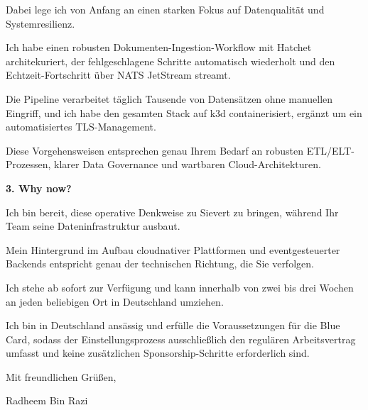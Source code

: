 \documentclass[11pt,a4paper]{coverletter}
\begin{document}
Dabei lege ich von Anfang an einen starken Fokus auf Datenqualität und Systemresilienz.

Ich habe einen robusten Dokumenten-Ingestion-Workflow mit Hatchet architekuriert, der fehlgeschlagene Schritte automatisch wiederholt und den Echtzeit-Fortschritt über NATS JetStream streamt.

Die Pipeline verarbeitet täglich Tausende von Datensätzen ohne manuellen Eingriff, und ich habe den gesamten Stack auf k3d containerisiert, ergänzt um ein automatisiertes TLS-Management.

Diese Vorgehensweisen entsprechen genau Ihrem Bedarf an robusten ETL/ELT-Prozessen, klarer Data Governance und wartbaren Cloud-Architekturen.

\vspace{8pt}\noindent\textbf{3. Why now?}\par\vspace{3pt}

Ich bin bereit, diese operative Denkweise zu Sievert zu bringen, während Ihr Team seine Dateninfrastruktur ausbaut.

Mein Hintergrund im Aufbau cloudnativer Plattformen und eventgesteuerter Backends entspricht genau der technischen Richtung, die Sie verfolgen.

Ich stehe ab sofort zur Verfügung und kann innerhalb von zwei bis drei Wochen an jeden beliebigen Ort in Deutschland umziehen.

Ich bin in Deutschland ansässig und erfülle die Voraussetzungen für die Blue Card, sodass der Einstellungsprozess ausschließlich den regulären Arbeitsvertrag umfasst und keine zusätzlichen Sponsorship-Schritte erforderlich sind.

\closing{Mit freundlichen Grüßen,}{Radheem Bin Razi}
\end{document}
